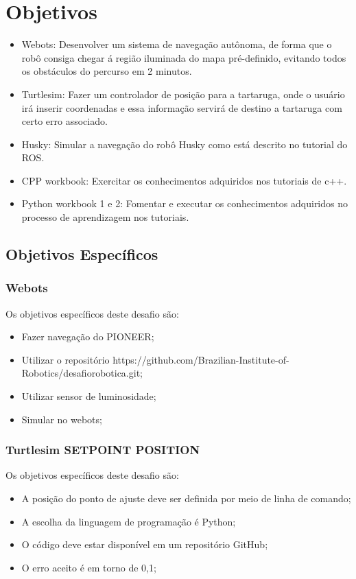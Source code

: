 \section{Objetivos}
\label{sec:obj}
\begin{itemize}
      \item Webots:
Desenvolver um sistema de navegação autônoma, de forma que o robô consiga chegar 
á região iluminada do mapa pré-definido, evitando todos os obstáculos do percurso em 2 minutos.
      \item Turtlesim:
Fazer um controlador de posição para a tartaruga, onde o usuário irá inserir coordenadas e essa informação servirá de destino a tartaruga com certo erro associado.
      \item Husky:
Simular a navegação do robô Husky como está descrito no tutorial do ROS.
      \item CPP workbook:
Exercitar os conhecimentos adquiridos nos tutoriais de c++.
      \item Python workbook 1 e 2:
Fomentar e executar os conhecimentos adquiridos no processo de aprendizagem nos tutoriais.
  \end{itemize}
\subsection{Objetivos Específicos}
\label{ssec:objesp}
\subsubsection{Webots}
Os objetivos específicos deste desafio são:
\begin{itemize}
      \item Fazer navegação do PIONEER;
      \item Utilizar o repositório https://github.com/Brazilian-Institute-of-Robotics/desafiorobotica.git;
      \item Utilizar sensor de luminosidade;
      \item Simular no webots;
  \end{itemize}
\subsubsection{Turtlesim SETPOINT POSITION}
Os objetivos específicos deste desafio são:
\begin{itemize}
      \item A posição do ponto de ajuste deve ser definida por meio de linha de comando;
      \item A escolha da linguagem de programação é Python;
      \item O código deve estar disponível em um repositório GitHub;
      \item O erro aceito é em torno de 0,1;
  \end{itemize}
